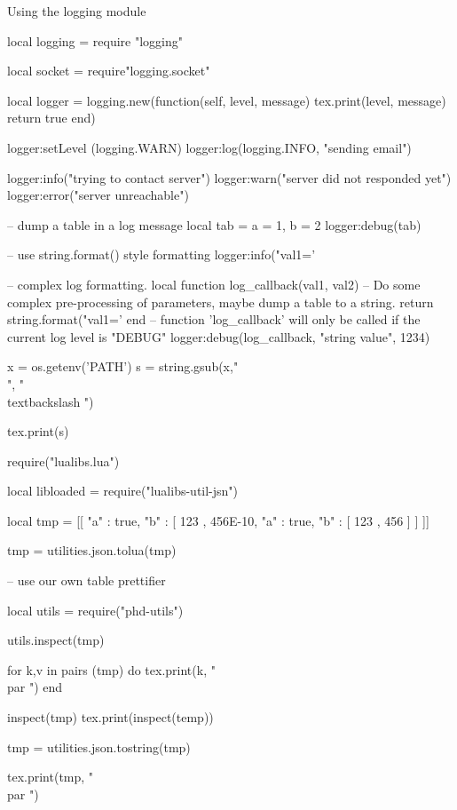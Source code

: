  
\begin{texexample}{Using the logging module}{}
\begin{luacode}
local logging = require "logging"

local socket = require"logging.socket"

local logger = logging.new(function(self, level, message)
                             tex.print(level, message)
                             return true
                           end)
                           
logger:setLevel (logging.WARN)
logger:log(logging.INFO, "sending email")

logger:info("trying to contact server")
logger:warn("server did not responded yet")
logger:error("server unreachable")

-- dump a table in a log message
local tab = { a = 1, b = 2 }
logger:debug(tab)

-- use string.format() style formatting
logger:info("val1='%

-- complex log formatting.
local function log_callback(val1, val2)
	-- Do some complex pre-processing of parameters, maybe dump a table to a string.
	return string.format("val1='%
end
-- function 'log_callback' will only be called if the current log level is "DEBUG"
logger:debug(log_callback, "string value", 1234)

x = os.getenv('PATH')
s = string.gsub(x,"\\", "\\textbackslash ")

tex.print(s)

require("lualibs.lua")

local libloaded = require("lualibs-util-jsn")

local tmp = [[ { "a" : true, "b" : [ 123 , 456E-10, { "a" : true, "b" : [ 123 , 456 ] } ] } ]]

 tmp = utilities.json.tolua(tmp)
 
 
 -- use our own table prettifier
 
 local utils = require("phd-utils")
 
 utils.inspect(tmp)
 
 for k,v in pairs (tmp) do
    tex.print(k, " \\par ")
 end
 
inspect(tmp)
tex.print(inspect(temp))

tmp = utilities.json.tostring(tmp)

tex.print(tmp, " \\par ")



\end{luacode}
\end{texexample}
